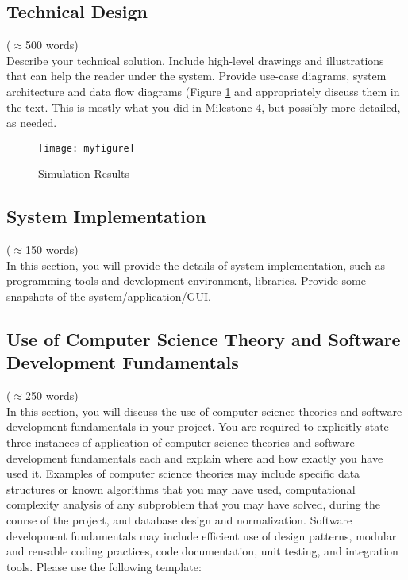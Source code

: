 \documentclass[12pt]{article}
\begin{document}
\subsection{Technical Design}\label{sec:design}
($\approx$500 words)\\
Describe your technical solution. Include high-level drawings and illustrations that can help
the reader under the system. Provide use-case diagrams, system architecture and data flow diagrams (Figure \ref{fig:simulationfigure} and appropriately discuss them in the text. This is mostly what you did in Milestone 4, but possibly more detailed, as needed.

\begin{figure}[h]
    \centering
    \texttt{[image: myfigure]}
    \caption{Simulation Results}
    \label{fig:simulationfigure}
\end{figure}

\subsection{System Implementation}\label{chap:implementation}
($\approx$150 words)\\
In this section, you will provide the details of system implementation, such as programming tools and development environment, libraries. Provide some snapshots of the system/application/GUI.

\subsection{Use of Computer Science Theory and Software Development Fundamentals}\label{chap:theory_sw} 
($\approx$250 words)\\

In this section, you will discuss the use of computer science theories and software development fundamentals in your project.
You are required to explicitly state three instances of application of computer science theories and software development fundamentals each and explain where and how exactly you have used it. Examples of computer science theories may include specific data structures or known algorithms that you may have used, computational complexity analysis of any subproblem that you may have solved, during the course of the project, and database design and normalization. Software development fundamentals may include efficient use of design patterns, modular and reusable coding practices, code documentation, unit testing, and integration tools. Please use the following template:
\end{document}
